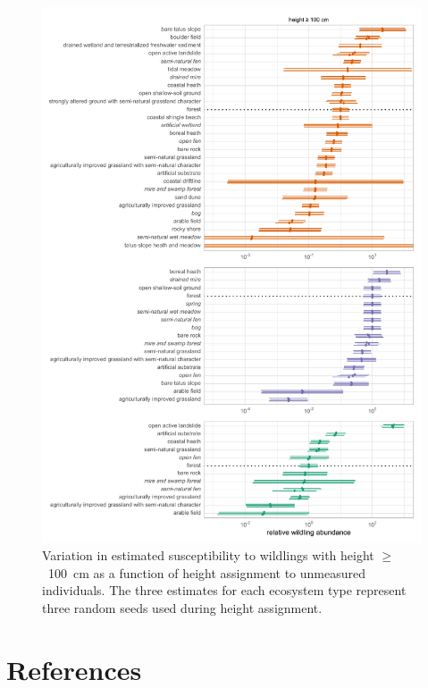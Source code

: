 \documentclass[
]{article}
\begin{document}
\begin{figure}
\centering
\includegraphics{figures/susceptibility-sensitivity-randomseed.pdf}
\caption{\label{fig:sensitivity-seed}Variation in estimated susceptibility to wildlings with height \(\geq\)~100~cm as a function of height assignment to unmeasured individuals. The three estimates for each ecosystem type represent three random seeds used during height assignment.}
\end{figure}

\section*{References}\label{references}
\end{document}
